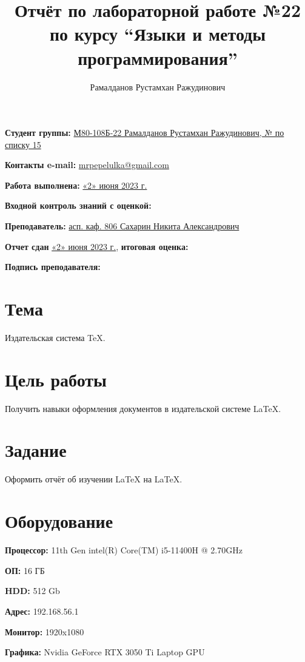 \documentclass[12pt, letterpaper]{article}
\title{Отчёт по лабораторной работе №22 по курсу “Языки и методы программирования”}
\author{Рамалданов Рустамхан Ражудинович}
\begin{document}
\maketitle
\begin{description}
\item\textbf{Студент группы:} \underline{М80-108Б-22 Рамалданов Рустамхан Ражудинович, № по списку 15}    
\item\textbf{Контакты e-mail:} \underline{mrpepelulka@gmail.com}
\item\textbf{Работа выполнена:} \underline{«2» июня 2023 г.}
\item\textbf{Входной контроль знаний с оценкой:} 
\item\textbf{Преподаватель:} \underline{асп. каф. 806 Сахарин Никита Александрович}
\item\textbf{Отчет сдан} \underline{«2» июня 2023 г.}, \textbf{итоговая оценка:}
\item\textbf{Подпись преподавателя:} \underline{\hspace{3cm}}
\end{description}
\newpage
\section{Тема}
Издательская система \TeX{}.
\section{Цель работы}
Получить навыки оформления документов в издательской системе \LaTeX{}.
\section{Задание}
Оформить отчёт об изучении \LaTeX{} на \LaTeX{}.
\section{Оборудование}
\begin{description}
\item\textbf{Процессор:} 11th Gen intel(R) Core(TM) i5-11400H @ 2.70GHz
\item\textbf{ОП:} 16 ГБ
\item\textbf{HDD:} 512 Gb
\item\textbf{Адрес:} 192.168.56.1
\item\textbf{Монитор:} 1920x1080
\item\textbf{Графика:} Nvidia GeForce RTX 3050 Ti Laptop GPU
\end{description}
\end{document}
